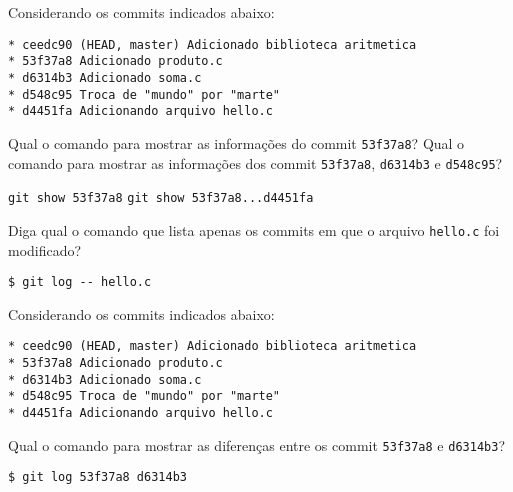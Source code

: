 \begin{Exercise}[label={0032}, difficulty={1}, origin={git}]
  Considerando os commits indicados abaixo:
  \begin{lstlisting}
* ceedc90 (HEAD, master) Adicionado biblioteca aritmetica
* 53f37a8 Adicionado produto.c
* d6314b3 Adicionado soma.c
* d548c95 Troca de "mundo" por "marte"
* d4451fa Adicionando arquivo hello.c
  \end{lstlisting}
  \Question Qual o comando para mostrar as informações do commit
  \lstinline+53f37a8+?
  \Question Qual o comando para mostrar as informações dos commit
  \lstinline+53f37a8+, \lstinline+d6314b3+ e \lstinline+d548c95+?
\end{Exercise}
\begin{Answer}[ref={0032}]
  \Question \lstinline+git show 53f37a8+
  \Question \lstinline+git show 53f37a8...d4451fa+
\end{Answer}

\begin{Exercise}[label={0033}, difficulty={1}, origin={git}]
  Diga qual o comando que lista apenas os commits em que o arquivo
  \lstinline+hello.c+ foi modificado?
\end{Exercise}
\begin{Answer}[ref={0033}]
  \begin{lstlisting}
$ git log -- hello.c
  \end{lstlisting}
\end{Answer}

\begin{Exercise}[label={0032}, difficulty={1}, origin={git}]
  Considerando os commits indicados abaixo:
  \begin{lstlisting}
* ceedc90 (HEAD, master) Adicionado biblioteca aritmetica
* 53f37a8 Adicionado produto.c
* d6314b3 Adicionado soma.c
* d548c95 Troca de "mundo" por "marte"
* d4451fa Adicionando arquivo hello.c
  \end{lstlisting}
  Qual o comando para mostrar as diferenças entre os commit
  \lstinline+53f37a8+ e \lstinline+d6314b3+?
\end{Exercise}
\begin{Answer}[ref={0032}]
  \begin{lstlisting}
$ git log 53f37a8 d6314b3
  \end{lstlisting}
\end{Answer}

